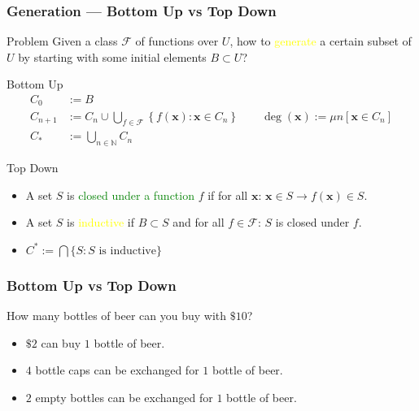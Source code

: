 \documentclass[UTF8,aspectratio=43,11pt,colorlinks,compress,openany]{beamer}%
\begin{document}
\begin{frame}\frametitle{Generation --- Bottom Up vs Top Down}
\setlength\abovedisplayskip{0pt}
\setlength\belowdisplayskip{0pt}
	\begin{block}{Problem}
		Given a class $\mathcal{F}$ of functions over $U$, how to \textcolor{yellow}{generate} a certain subset of $U$ by starting with some initial elements $B\subset U$?
	\end{block}
			\begin{block}{Bottom Up}\vspace{-4pt}
				\begin{align*}
				C_0&:=B\\ C_{n+1}&:=C_n\cup\bigcup\limits_{f\in\mathcal{F}}\left\{f(\mathbf{x}): \mathbf{x}\in C_n\right\}\qquad\operatorname{deg}(\mathbf{x}):=\mu n\left[\mathbf{x}\in C_n\right]\\
				C_*&:=\bigcup\limits_{n\in\mathbb{N}} C_n
				\end{align*}
			\end{block}
			\begin{block}{Top Down}
				\begin{itemize}
					\item A set $S$ is \textcolor{green}{closed under a function} $f$ if for all $\mathbf{x}$: $\mathbf{x}\in S\to f(\mathbf{x})\in S$.
					\item A set $S$ is \textcolor{yellow}{inductive} if $B\subset S$ and for all $f\in\mathcal{F}$: $S$ is closed under $f$.
					\item $C^*:=\bigcap\{S: S\mbox{ is inductive}\}$
				\end{itemize}
			\end{block}
\end{frame}

\begin{frame}\frametitle{Bottom Up vs Top Down}
	\begin{block}{How many bottles of beer can you buy with $\$10$?}
		\begin{itemize}
		\item $\$2$ can buy $1$ bottle of beer.
		\item $4$ bottle caps can be exchanged for $1$ bottle of beer.
		\item $2$ empty bottles can be exchanged for $1$ bottle of beer.
		\end{itemize}
	\end{block}
\end{frame}
\end{document}
